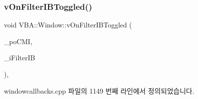 \subsubsection{\texorpdfstring{v\+On\+Filter\+I\+B\+Toggled()}{vOnFilterIBToggled()}}
{\footnotesize\ttfamily void V\+B\+A\+::\+Window\+::v\+On\+Filter\+I\+B\+Toggled (\begin{DoxyParamCaption}\item[{Gtk\+::\+Check\+Menu\+Item $\ast$}]{\+\_\+po\+C\+MI,  }\item[{\mbox{\hyperlink{_util_8cpp_a0ef32aa8672df19503a49fab2d0c8071}{int}}}]{\+\_\+i\+Filter\+IB }\end{DoxyParamCaption})\hspace{0.3cm}{\ttfamily [protected]}, {\ttfamily [virtual]}}



windowcallbacks.\+cpp 파일의 1149 번째 라인에서 정의되었습니다.



